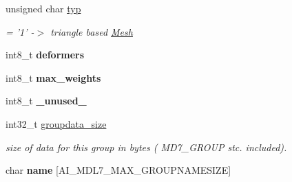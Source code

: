 \begin{DoxyCompactItemize}
\item 
\hypertarget{struct_assimp_1_1_m_d_l_1_1_group___m_d_l7_a89420afda8c2a0cd3411927d77a7d146}{unsigned char \hyperlink{struct_assimp_1_1_m_d_l_1_1_group___m_d_l7_a89420afda8c2a0cd3411927d77a7d146}{typ}}\label{struct_assimp_1_1_m_d_l_1_1_group___m_d_l7_a89420afda8c2a0cd3411927d77a7d146}

\begin{DoxyCompactList}\small\item\em = '1' -\/$>$ triangle based \hyperlink{class_mesh}{Mesh} \end{DoxyCompactList}\item 
\hypertarget{struct_assimp_1_1_m_d_l_1_1_group___m_d_l7_a418f56bc4cd45d0bd63963e44ca7c69c}{int8\+\_\+t {\bfseries deformers}}\label{struct_assimp_1_1_m_d_l_1_1_group___m_d_l7_a418f56bc4cd45d0bd63963e44ca7c69c}

\item 
\hypertarget{struct_assimp_1_1_m_d_l_1_1_group___m_d_l7_ab4077ca63f6b5be3356d7f5b65a29f79}{int8\+\_\+t {\bfseries max\+\_\+weights}}\label{struct_assimp_1_1_m_d_l_1_1_group___m_d_l7_ab4077ca63f6b5be3356d7f5b65a29f79}

\item 
\hypertarget{struct_assimp_1_1_m_d_l_1_1_group___m_d_l7_aa1e070a54ad089cd22b067f38c6cf2f7}{int8\+\_\+t {\bfseries \+\_\+unused\+\_\+}}\label{struct_assimp_1_1_m_d_l_1_1_group___m_d_l7_aa1e070a54ad089cd22b067f38c6cf2f7}

\item 
\hypertarget{struct_assimp_1_1_m_d_l_1_1_group___m_d_l7_a4edad35a86512cfd4e212d4f1d2b0c8e}{int32\+\_\+t \hyperlink{struct_assimp_1_1_m_d_l_1_1_group___m_d_l7_a4edad35a86512cfd4e212d4f1d2b0c8e}{groupdata\+\_\+size}}\label{struct_assimp_1_1_m_d_l_1_1_group___m_d_l7_a4edad35a86512cfd4e212d4f1d2b0c8e}

\begin{DoxyCompactList}\small\item\em size of data for this group in bytes ( M\+D7\+\_\+\+G\+R\+O\+U\+P stc. included). \end{DoxyCompactList}\item 
\hypertarget{struct_assimp_1_1_m_d_l_1_1_group___m_d_l7_acf7fc8ed9c3ee319b586be9dac648bd6}{char {\bfseries name} \mbox{[}A\+I\+\_\+\+M\+D\+L7\+\_\+\+M\+A\+X\+\_\+\+G\+R\+O\+U\+P\+N\+A\+M\+E\+S\+I\+Z\+E\mbox{]}}\label{struct_assimp_1_1_m_d_l_1_1_group___m_d_l7_acf7fc8ed9c3ee319b586be9dac648bd6}


\end{DoxyCompactItemize}
